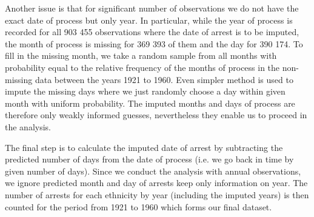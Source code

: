 Another issue is that for significant number of observations we do not have the exact date of process but only year. In particular, 
while the year of process is recorded for all 903 455 observations where the date of arrest is to be imputed, the month of process is missing for 369 393 of them and the day for 390 174. 
To fill in the missing month, we take a random sample from all months with probability equal to the relative frequency of the months of process in the non-missing data between the years 1921 to 1960. 
Even simpler method is used to impute the missing days where we just randomly choose a day within given month with uniform probability. 
The imputed months and days of process are therefore only weakly informed guesses, nevertheless they enable us to proceed in the analysis. 

The final step is to calculate the imputed date of arrest by subtracting the predicted number of days from the date of process (i.e. we go back in time by given number of days). Since we conduct the analysis with annual observations, we ignore predicted month and day of arrests  keep only information on year. The number of arrests for each ethnicity by year (including the imputed years) is then counted for the period from 1921 to 1960 which forms our final dataset. 
